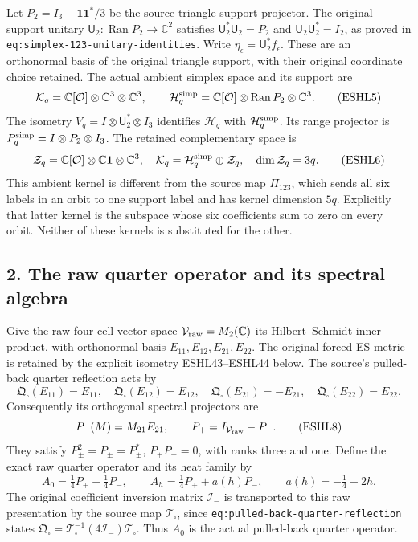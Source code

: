 \documentclass[
  10pt,
  a4paper,
]{article}
\begin{document}
Let \(P_2=I_3-\mathbf1\mathbf1^*/3\) be the source triangle support
projector. The original support unitary
\(\mathsf U_2:\operatorname{Ran}P_2\to\mathbb C^2\) satisfies
\(\mathsf U_2^*\mathsf U_2=P_2\) and \(\mathsf U_2\mathsf U_2^*=I_2\),
as proved in \texttt{eq:\allowbreak{}simplex-\allowbreak{}123-\allowbreak{}unitary-\allowbreak{}identities}. Write
\(\eta_\epsilon=\mathsf U_2^*f_\epsilon\). These are an orthonormal
basis of the original triangle support, with their original coordinate
choice retained. The actual ambient simplex space and its support are \[
\mathcal K_q=\mathbb C[\mathcal O]\otimes\mathbb C^3\otimes\mathbb C^3,
\qquad
\mathcal H_q^{\rm simp}=\mathbb C[\mathcal O]\otimes\operatorname{Ran}P_2\otimes\mathbb C^3.
\tag{ESHL5}
\] The isometry \(V_q=I\otimes\mathsf U_2^*\otimes I_3\) identifies
\(\mathcal H_q\) with \(\mathcal H_q^{\rm simp}\). Its range projector
is \(P_q^{\rm simp}=I\otimes P_2\otimes I_3\). The retained
complementary space is \[
\mathcal Z_q=\mathbb C[\mathcal O]\otimes\mathbb C\mathbf1\otimes\mathbb C^3,
\quad\mathcal K_q=\mathcal H_q^{\rm simp}\oplus\mathcal Z_q,
\quad\dim\mathcal Z_q=3q.
\tag{ESHL6}
\] This ambient kernel is different from the source map \(\Pi_{123}\),
which sends all six labels in an orbit to one support label and has
kernel dimension \(5q\). Explicitly that latter kernel is the subspace
whose six coefficients sum to zero on every orbit. Neither of these
kernels is substituted for the other.

\subsection{2. The raw quarter operator and its spectral
algebra}\label{the-raw-quarter-operator-and-its-spectral-algebra}

Give the raw four-cell vector space
\(\mathcal V_{\rm raw}=M_2(\mathbb C)\) its Hilbert--Schmidt inner
product, with orthonormal basis \(E_{11},E_{12},E_{21},E_{22}\). The
original forced ES metric is retained by the explicit isometry
ESHL43--ESHL44 below. The source's pulled-back quarter reflection acts
by \[
\mathfrak Q_\square(E_{11})=E_{11},\quad
\mathfrak Q_\square(E_{12})=E_{12},\quad
\mathfrak Q_\square(E_{21})=-E_{21},\quad
\mathfrak Q_\square(E_{22})=E_{22}.
\tag{ESHL7}
\] Consequently its orthogonal spectral projectors are \[
P_-(M)=M_{21}E_{21},\qquad P_+=I_{\mathcal V_{\rm raw}}-P_-.
\tag{ESHL8}
\] They satisfy \(P_\pm^2=P_\pm=P_\pm^*\), \(P_+P_-=0\), with ranks
three and one. Define the exact raw quarter operator and its heat family
by \[
A_0=\tfrac14P_+-\tfrac14P_-,\qquad
A_h=\tfrac14P_++a(h)P_-,\qquad a(h)=-\tfrac14+2h.
\tag{ESHL9}
\] The original coefficient inversion matrix \(\mathcal I_-\) is
transported to this raw presentation by the source map
\(\mathcal T_\square\), since \texttt{eq:\allowbreak{}pulled-\allowbreak{}back-\allowbreak{}quarter-\allowbreak{}reflection}
states
\(\mathfrak Q_\square=\mathcal T_\square^{-1}(4\mathcal I_-)\mathcal T_\square\).
Thus \(A_0\) is the actual pulled-back quarter operator.
\end{document}
